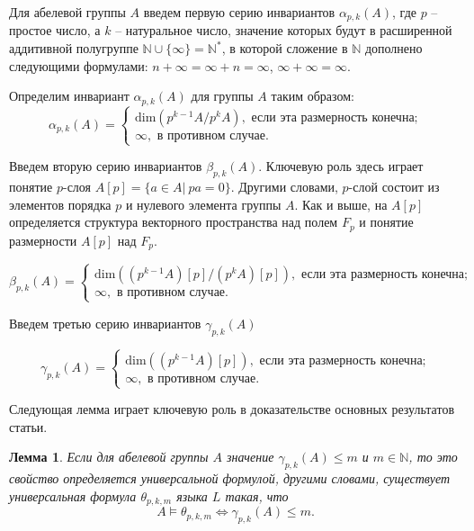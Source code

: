 \documentclass[a4paper,11pt,twoside]{article}
\newtheorem{lemma}{Лемма}[section]
\def\N{{\mathbb{N}}}
\begin{document}
Для абелевой группы $A$ введем первую серию инвариантов $\alpha_{p,k}(A)$, где $p$ -- простое число, а $k$ -- натуральное число, значение которых будут в расширенной аддитивной полугруппе $\N \cup \{\infty \} = \N^*$, в которой сложение в $\N$ дополнено следующими формулами: $n + \infty = \infty + n = \infty$, $\infty + \infty = \infty$.

Определим инвариант $\alpha_{p,k}(A)$ для группы $A$ таким образом:
$$\alpha_{p,k}(A) = \left\lbrace 
\begin{array}{l}  
\mathrm{dim} \left( p^{k-1}A \Big/ p^k A \right), \text{ если эта размерность конечна;} \\ 
\infty, \text{ в противном случае.}
\end{array} 
\right.$$

Введем вторую серию инвариантов $\beta_{p,k}(A)$. Ключевую роль здесь играет понятие $p$-слоя $A[p] = \{a \in A | \ pa = 0\}$. Другими словами, $p$-слой состоит из элементов порядка $p$ и нулевого элемента группы $A$. Как и выше, на $A[p]$ определяется структура векторного пространства над полем $F_p$ и понятие размерности $A[p]$ над $F_p$.

$$\beta_{p,k}(A) = \left\lbrace 
\begin{array}{l}  
\mathrm{dim} \left( (p^{k-1}A) [p] \Big/ (p^k A) [p] \right), \text{ если эта размерность конечна;} \\ 
\infty, \text{ в противном случае.}
\end{array} 
\right.$$

Введем третью серию инвариантов $\gamma_{p,k}(A)$

$$\gamma_{p,k}(A) = \left\lbrace 
\begin{array}{l}  
\mathrm{dim} \left( (p^{k-1} A) [p] \right), \text{ если эта размерность конечна;} \\ 
\infty, \text{ в противном случае.}
\end{array} 
\right.$$

Следующая лемма играет ключевую роль в доказательстве основных результатов статьи.

\begin{lemma}\label{lemma:gamma}
Если для абелевой группы $A$ значение $\gamma_{p,k}(A) \leq m$ и $m \in \N$, то это свойство определяется универсальной формулой, другими словами, существует универсальная формула $\theta_{p,k,m}$ языка $L$ такая, что 
$$A \models \theta_{p,k,m} \Leftrightarrow \gamma_{p,k}(A) \leq m.$$
\end{lemma}
 
\end{document}

